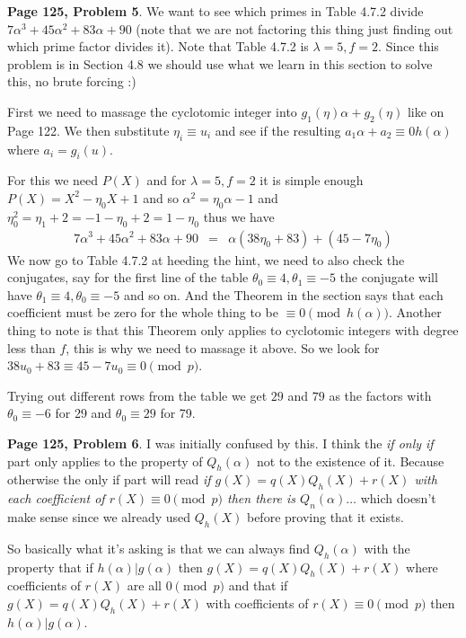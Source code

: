 \documentclass[aps,preprint,preprintnumbers,nofootinbib,showpacs,prd]{revtex4-1}
\newcommand{\nbea}{\begin{eqnarray*}}
\newcommand{\neea}{\end{eqnarray*}}
\begin{document}
{\bf Page 125, Problem 5}. We want to see which primes in Table 4.7.2 divide $7\alpha^3 + 45\alpha^2 + 83\alpha + 90$ (note that we are not factoring this thing just finding out which prime factor divides it). Note that Table 4.7.2 is $\lambda = 5, f = 2$. Since this problem is in Section 4.8 we should use what we learn in this section to solve this, no brute forcing :)

First we need to massage the cyclotomic integer into $g_1(\eta)\alpha + g_2(\eta)$ like on Page 122. We then substitute $\eta_i \equiv u_i$ and see if the resulting $a_1 \alpha + a_2 \equiv 0 h(\alpha)$ where $a_i = g_i(u)$.

For this we need $P(X)$ and for $\lambda = 5, f = 2$ it is simple enough $P(X) = X^2 - \eta_0X + 1$ and so $\alpha^2 = \eta_0\alpha - 1$ and $\eta_0^2 = \eta_1 + 2 = -1 - \eta_0 + 2 = 1 - \eta_0$ thus we have
%
\nbea
7\alpha^3 + 45\alpha^2 + 83\alpha + 90 & = & \alpha(38 \eta_0 + 83) + (45 - 7\eta_0)
\neea
%
We now go to Table 4.7.2 at heeding the hint, we need to also check the conjugates, say for the first line of the table $\theta_0 \equiv 4, \theta_1 \equiv -5$ the conjugate will have $\theta_1 \equiv 4, \theta_0 \equiv -5$ and so on. And the Theorem in the section says that each coefficient must be zero for the whole thing to be $\equiv 0 \pmod{h(\alpha)}$. Another thing to note is that this Theorem only applies to cyclotomic integers with degree less than $f$, this is why we need to massage it above. So we look for $38 u_0 + 83 \equiv 45 - 7u_0 \equiv 0 \pmod{p}$.

Trying out different rows from the table we get $29$ and $79$ as the factors with $\theta_0 \equiv -6$ for 29 and $\theta_0 \equiv 29$ for 79.

{\bf Page 125, Problem 6}. I was initially confused by this. I think the {\it if only if} part only applies to the property of $Q_h(\alpha)$ not to the existence of it. Because otherwise the only if part will read {\it if $g(X) = q(X)Q_h(X) + r(X)$ with each coefficient of $r(X) \equiv 0\pmod{p}$ then there is $Q_n(\alpha) \dots$} which doesn't make sense since we already used $Q_h(X)$ before proving that it exists.

So basically what it's asking is that we can always find $Q_h(\alpha)$ with the property that if $h(\alpha) | g(\alpha)$ then $g(X) = q(X)Q_h(X) + r(X)$ where coefficients of $r(X)$ are all $0 \pmod{p}$ and that if $g(X) = q(X)Q_h(X) + r(X)$ with coefficients of $r(X) \equiv 0\pmod{p}$ then $h(\alpha)|g(\alpha)$.
\end{document}
